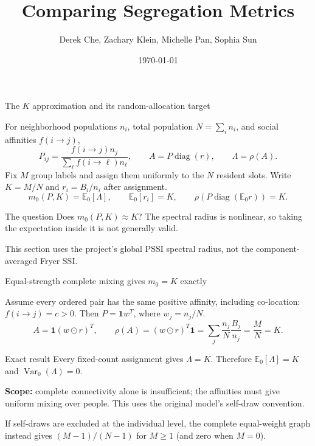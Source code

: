 \documentclass[aspectratio=169,10pt]{beamer}
\title{Comparing Segregation Metrics}
\author[Che, Klein, Pan, Sun]{Derek Che, Zachary Klein, Michelle Pan, Sophia Sun}
\date{\today}
\begin{document}
\begin{frame}{The $K$ approximation and its random-allocation target}
\small

For neighborhood populations $n_i$, total population $N=\sum_i n_i$, and social affinities $f(i\to j)$,
\[
 P_{ij}=\frac{f(i\to j)n_j}{\sum_\ell f(i\to\ell)n_\ell},\qquad
 A=P\operatorname{diag}(r),\qquad \Lambda=\rho(A).
\]
Fix $M$ group labels and assign them uniformly to the $N$ resident slots.
Write $K=M/N$ and $r_i=B_i/n_i$ after assignment.
\[
 m_0(P,K)=\mathbb E_0[\Lambda],\qquad
 \mathbb E_0[r_i]=K,\qquad \rho(P\operatorname{diag}(\mathbb E_0r))=K.
\]
\begin{block}{The question}
Does $m_0(P,K)\approx K$? The spectral radius is nonlinear, so taking the expectation inside it is not generally valid.
\end{block}
This section uses the project's global PSSI spectral radius, not the component-averaged Fryer SSI.

\end{frame}

\begin{frame}{Equal-strength complete mixing gives $m_0=K$ exactly}
\small

Assume every ordered pair has the same positive affinity, including co-location:
$f(i\to j)=c>0$. Then $P=\mathbf1w^T$, where $w_j=n_j/N$.
\[
 A=\mathbf1(w\odot r)^T,\qquad
 \rho(A)=(w\odot r)^T\mathbf1
       =\sum_j\frac{n_j}{N}\frac{B_j}{n_j}
       =\frac MN=K.
\]
\begin{block}{Exact result}
Every fixed-count assignment gives $\Lambda=K$. Therefore
$\mathbb E_0[\Lambda]=K$ and $\operatorname{Var}_0(\Lambda)=0$.
\end{block}
\textbf{Scope:} complete connectivity alone is insufficient; the affinities must give uniform mixing over people. This uses the original model's self-draw convention.
\medskip

\footnotesize If self-draws are excluded at the individual level, the complete equal-weight graph instead gives $(M-1)/(N-1)$ for $M\geq1$ (and zero when $M=0$).

\end{frame}
\end{document}
